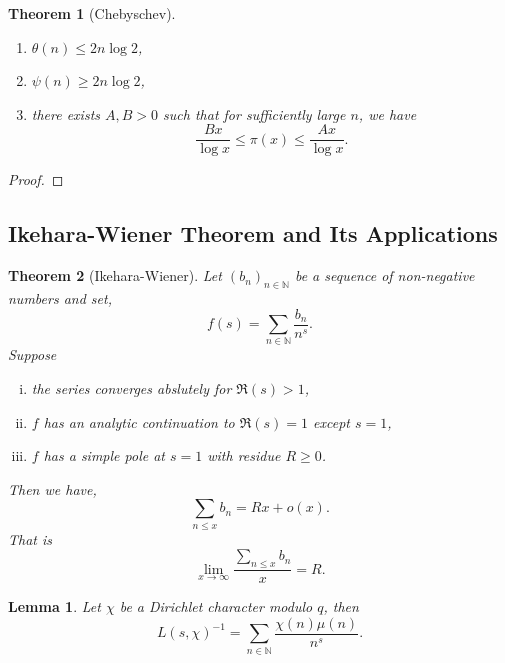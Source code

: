 \documentclass{article}
\newtheorem{theorem}{Theorem} [section]
\newtheorem{lemma}{Lemma}[section]
\newcommand{\N}[0]{\mathbb{N}}
\begin{document}
\begin{theorem}[Chebyschev]$\:$
  \begin{enumerate}[1).]
    \item $\theta(n)\leq 2n\log2$,
    \item $\psi(n)\geq 2n\log 2$,
    \item there exists $A,B>0$ such that for sufficiently large $n$, we have 
    \begin{equation*}
      {\frac {Bx} {\log x}}\leq \pi(x)\leq {\frac {Ax} {\log x}}.
    \end{equation*}
  \end{enumerate}
\end{theorem}

\begin{proof}
\end{proof}

\subsection{Ikehara-Wiener Theorem and Its Applications}


\begin{theorem}[Ikehara-Wiener]
  \label{theorem_ikehara_wiener}
  Let $(b_n)_{n\in\N}$ be a sequence of non-negative numbers and set,
  \begin{equation*}
    f(s) = \sum_{n\in\N}{\frac {b_n} {n^s}}.
  \end{equation*}
  Suppose 
  \begin{enumerate}[i).]
    \item the series converges abslutely for $\Re(s)>1$,
    \item $f$ has an analytic continuation to $\Re(s)=1$ except $s=1$,
    \item $f$ has a simple pole at $s=1$ with residue $R\geq0$.
  \end{enumerate}
  Then we have,
  \begin{equation*}
    \sum_{n\leq x}b_n = Rx+o(x).
  \end{equation*}
  That is 
  \begin{equation*}
    \lim_{x\to\infty}{\frac {\sum_{n\leq x}b_n} {x}} = R.
  \end{equation*}
\end{theorem}

\begin{lemma}
  Let $\chi$ be a Dirichlet character modulo $q$, then 
  \begin{equation*}
    L(s,\chi)^{-1} = \sum_{n\in\N}{\frac {\chi(n)\mu(n)} {n^s}}.
  \end{equation*}
  \label{lemma_dirichlet_inverse}
\end{lemma}
\end{document}
